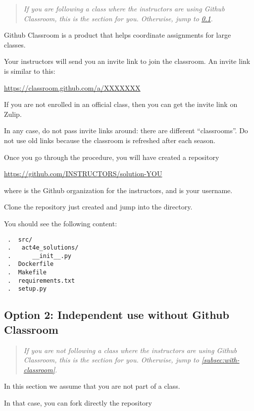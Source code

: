 \begin{quote}
  \emph{
    If you are following a class where the instructors are using Github Classroom,
    this is the section for you. Otherwise, jump to \cref{sub:without-classroom}.}
\end{quote}

Github Classroom is a product that helps coordinate assignments for large classes.

Your instructors will send you an invite link to join the classroom. An invite link is similar to this:

\url{https://classroom.github.com/a/XXXXXXX}

If you are not enrolled in an official class, then you can get the invite link on Zulip.

In any case, do not pass invite links around: there are different ``classrooms''.
Do not use old links because the classroom is refreshed after each season.

Once you go through the procedure, you will have created a repository

\url{https://github.com/INSTRUCTORS/solution-YOU}

where  is the Github organization for the instructors, and  is your username.

Clone the repository just created and jump into the directory.

You should see the following content:

\begin{verbatim}
 .  src/
 .   act4e_solutions/
 .      __init__.py
 .  Dockerfile
 .  Makefile
 .  requirements.txt
 .  setup.py
\end{verbatim}

\subsection{Option 2: Independent use without Github Classroom}
\label{sub:without-classroom}

\begin{quote}
  \emph{
    If you are \emph{not} following a class where the instructors are using Github Classroom,
    this is the section for you. Otherwise, jump to \cref{subsec:with-classroom}.
  }
\end{quote}

In this section we assume that you are not part of a class.

In that case, you can fork directly the repository

